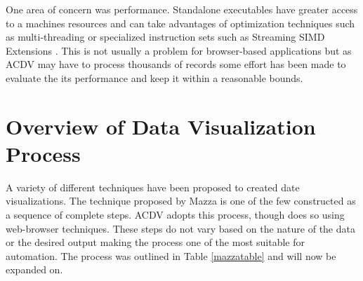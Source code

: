 \documentclass[a4paper, 11pt, titlepage, onehalfspacing]{report}
\begin{document}
One area of concern was performance. Standalone executables have greater access to a machines resources and can take advantages of optimization techniques such as multi-threading or specialized instruction sets such as Streaming SIMD Extensions \cite{sse}. This is not usually a problem for browser-based applications but as AC\lightning{}DV may have to process thousands of records some effort has been made to evaluate the its performance and keep it within a reasonable bounds.


\section{Overview of Data Visualization Process}
A variety of different techniques have been proposed to created date visualizations. The technique proposed by Mazza \cite{mazza2009introduction} is one of the few constructed as a sequence of complete steps. AC\lightning{}DV adopts this process, though does so using web-browser techniques. These steps do not vary based on the nature of the data or the desired output making the process one of the most suitable for automation. The process was outlined in Table \ref{mazzatable} and will now be expanded on.
\end{document}
